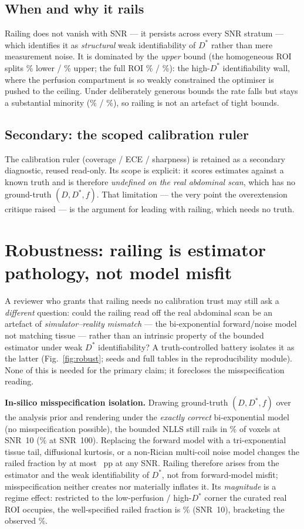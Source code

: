\documentclass[11pt]{article}
\begin{document}
\subsection{When and why it rails}
Railing does not vanish with SNR --- it persists across every SNR stratum --- which
identifies it as \emph{structural} weak identifiability of $D^{*}$ rather than mere
measurement noise. It is dominated by the \emph{upper} bound (the homogeneous ROI
splits \HomoLower\% lower / \HomoUpper\% upper; the full ROI \FullLower\% /
\FullUpper\%): the high-$D^{*}$ identifiability wall, where the perfusion compartment
is so weakly constrained the optimiser is pushed to the ceiling. Under deliberately
generous bounds the rate falls but stays a substantial minority (\HomoWide\% /
\FullWide\%), so railing is not an artefact of tight bounds.

\subsection{Secondary: the scoped calibration ruler}
\label{sec:ruler}
The calibration ruler (coverage / ECE / sharpness) is retained as a secondary
diagnostic, reused read-only. Its scope is explicit: it scores estimates against a
known truth and is therefore \emph{undefined on the real abdominal scan}, which has
no ground-truth $(D, D^{*}, f)$. That limitation --- the very point the
overextension critique raised --- is the argument for leading with railing, which
needs no truth.

\section{Robustness: railing is estimator pathology, not model misfit}
\label{sec:robust}
A reviewer who grants that railing needs no calibration trust may still ask a
\emph{different} question: could the railing read off the real abdominal scan be an
artefact of \emph{simulator--reality mismatch} --- the bi-exponential forward/noise
model not matching tissue --- rather than an intrinsic property of the bounded
estimator under weak $D^{*}$ identifiability? A truth-controlled battery isolates it
as the latter (Fig.~\ref{fig:robust}; seeds and full tables in the reproducibility
module). None of this is needed for the primary claim; it forecloses the
misspecification reading.

\textbf{In-silico misspecification isolation.} Drawing \RobN{} ground-truth
$(D,D^{*},f)$ over the analysis prior and rendering under the \emph{exactly correct}
bi-exponential model (no misspecification possible), the bounded NLLS still rails in
\RobWSrailTen\% of voxels at SNR~10 (\RobWSrailHundred\% at SNR~100). Replacing the
forward model with a tri-exponential tissue tail, diffusional kurtosis, or a
non-Rician multi-coil noise model changes the railed fraction by at most
\RobMaxDelta~pp at any SNR. Railing therefore arises from the estimator and the weak
identifiability of $D^{*}$, not from forward-model misfit; misspecification neither
creates nor materially inflates it. Its \emph{magnitude} is a regime effect:
restricted to the low-perfusion / high-$D^{*}$ corner the curated real ROI occupies,
the well-specified railed fraction is \RobCornerTen\% (SNR~10), bracketing the
observed \HomoFrac\%.
\end{document}
